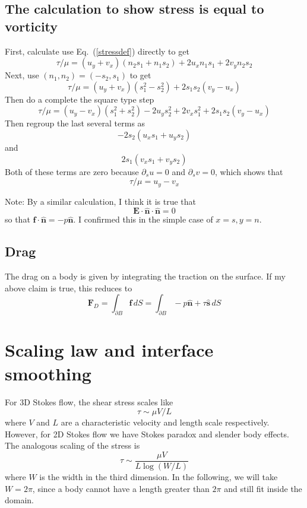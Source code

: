 \documentclass[11pt]{article}
\newcommand{\vsp}[1]{\vspace{#1 pc} \noindent}
\newcommand{\pdi}[2] { {\partial_#2} #1 }
\newcommand{\bvec}[1]{\ensuremath{\boldsymbol{#1}}}
\newcommand{\nhat}{\hat{\bvec{n}}}
\newcommand{\shat}{\hat{\bvec{s}}}
\newcommand {\bdry} {\partial B}
\begin{document}
\subsection{The calculation to show stress is equal to vorticity}
First, calculate use Eq.~(\ref{stressdef}) directly to get
\begin{equation}
\tau/\mu = (u_y+v_x) (n_2 s_1 + n_1 s_2 ) + 2 u_x n_1 s_1 + 2 v_y n_2 s_2
\end{equation}
Next, use $(n_1,n_2) = (-s_2,s_1)$ to get
\begin{equation}
\tau/\mu = (u_y+v_x) (s_1^2 - s_2^2) + 2s_1 s_2 (v_y - u_x)
\end{equation}
Then do a complete the square type step
\begin{equation}
\tau/\mu = (u_y - v_x) (s_1^2 + s_2^2) - 2 u_y s_2^2 + 2v_x s_1^2 + 2s_1 s_2 (v_y - u_x)
\end{equation}
Then regroup the last several terms as
\begin{equation}
-2 s_2 ( u_x s_1 + u_y s_2 )
\end{equation}
and
\begin{equation}
2 s_1 ( v_x s_1 + v_y s_2)
\end{equation}
Both of these terms are zero because $\pdi{u}{s} = 0$ and $\pdi{v}{s} = 0$, which shows that
\begin{equation}
\tau/\mu = u_y - v_x
\end{equation}

\vsp{1}
Note: By a similar calculation, I think it is true that
\begin{equation}
\bvec{E} \cdot \nhat \cdot \nhat = 0
\end{equation}
so that $\bvec{f} \cdot \nhat = -p \nhat$. I confirmed this in the simple case of $x=s, y=n$.

\subsection{Drag}
The drag on a body is given by integrating the traction on the surface. If my above claim is true, this reduces to
\begin{equation}
\bvec{F}_D = \int_{\bdry} \bvec{f} \, dS = \int_{\bdry} -p \nhat + \tau \shat \, dS
\end{equation}


\section{Scaling law and interface smoothing}
For 3D Stokes flow, the shear stress scales like
\begin{equation}
\tau \sim \mu V/L
\end{equation}
where $V$ and $L$ are a characteristic velocity and length scale respectively.  However, for 2D Stokes flow we have Stokes paradox and slender body effects. The analogous scaling of the stress is
\begin{equation}
\tau \sim \frac{\mu V}{L \log(W/L)}
\end{equation}
where $W$ is the width in the third dimension. In the following, we will take $W = 2\pi$, since a body cannot have a length greater than $2\pi$ and still fit inside the domain.
\end{document}
